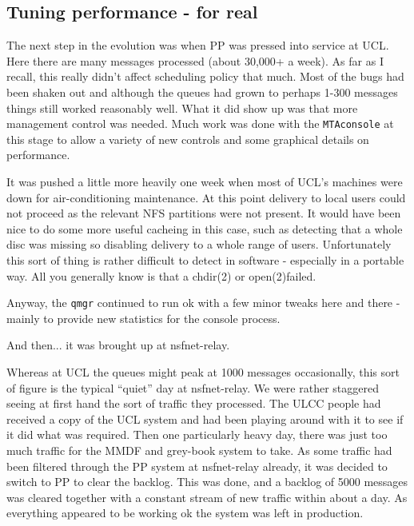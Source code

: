 \subsection{Tuning performance - for real}
The next step in the evolution was when PP was pressed into service at
UCL. Here there are many messages processed (about 30,000+ a week).
As far as I recall, this really didn't affect scheduling policy that
much. Most of the bugs had been shaken out and although the queues had
grown to perhaps 1-300 messages things still worked reasonably well.
What it did show up was that more management control was needed. Much
work was done with the \verb|MTAconsole| at this stage to allow a
variety of new controls and some graphical details on performance.

It was pushed a little more heavily one week when most of UCL's
machines were down for air-conditioning maintenance. At this point
delivery to local users could not proceed as the relevant NFS
partitions were not present. It would have been nice to do some more
useful cacheing in this case, such as detecting that a whole disc was
missing so disabling delivery to a whole range of users. Unfortunately
this sort of thing is rather difficult to detect in software -
especially in a portable way. All you generally know is that a
chdir(2) or open(2)failed.

Anyway, the \verb|qmgr| continued to run ok with a few minor tweaks here and
there - mainly to provide new statistics for the console process.

And then... it was brought up at nsfnet-relay. 

Whereas at UCL the queues might peak at 1000 messages occasionally,
this sort of figure is the typical ``quiet'' day at nsfnet-relay. We
were rather staggered seeing at first hand the sort of traffic they
processed. The ULCC people had received a copy of the UCL system and
had been playing around with it to see if it did what was required.
Then one particularly heavy day, there was just too much traffic for
the MMDF and grey-book system to take. As some traffic had been
filtered through the PP system at nsfnet-relay already, it was decided
to switch to PP to clear the backlog. This was done, and a backlog of
5000 messages was cleared together with a constant stream of new
traffic within about a day. As everything appeared to be working ok
the system was left in production.

